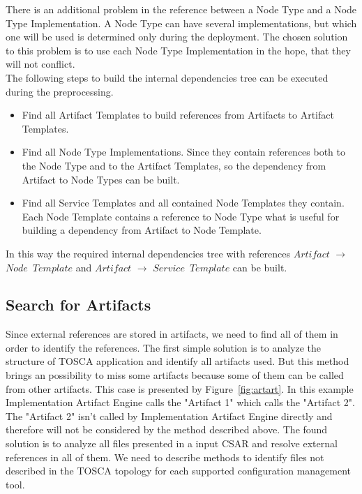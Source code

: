 There is an additional problem in the reference between a Node Type and a Node Type Implementation.
A Node Type can have several implementations, but which one will be used is determined only during the deployment. 
The chosen solution to this problem is to use each Node Type Implementation in the hope, that they will not conflict.\\
The following steps to build the internal dependencies tree can be executed during the preprocessing.
\begin{itemize}
	\item Find all Artifact Templates to build references from Artifacts to Artifact Templates.
	\item Find all Node Type Implementations. Since they contain references both to the Node Type and to the Artifact Templates, so the dependency from Artifact to Node Types can be built.
	\item Find all Service Templates and all contained Node Templates they contain. Each Node Template contains a reference to Node Type what is useful for building a dependency from Artifact to Node Template.
\end{itemize} 
In this way the required internal dependencies tree with references $Artifact$ $\rightarrow$ $Node$~$Template$ and $Artifact$ $\rightarrow$ $Service$~$Template$ can be built.


\subsection{Search for Artifacts}
Since external references are stored in artifacts, we need to find all of them in order to identify the references.
The first simple solution is to analyze the structure of TOSCA application and identify all artifacts used.
But this method brings an possibility to miss some artifacts because some of them can be called from other artifacts.
This case is presented by Figure~\ref{fig:artart}.
In this example Implementation Artifact Engine calls the "Artifact 1" which calls the "Artifact 2".
The "Artifact 2" isn't called by Implementation Artifact Engine  directly and therefore will not be considered by the method described above.
The found solution is to analyze all files presented in a input CSAR and resolve external references in all of them.
We need to describe methods to identify files not described in the TOSCA topology for each supported configuration management tool.


